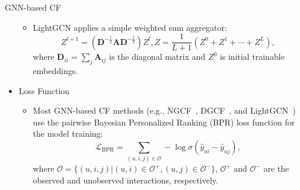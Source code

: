 \documentclass[t]{beamer}
\begin{document}
\begin{frame}[allowframebreaks]{GNN-based CF}
\begin{itemize}
    
    \begin{itemize}
        \item LightGCN applies a simple weighted sum aggregator:
\begin{equation*}
    \label{eq:lightgcn}
    Z^{l+1} =\left(\mathbf{D}^{-\frac{1}{2}} \mathbf{A} \mathbf{D}^{-\frac{1}{2}}\right) Z^{l}, 
    Z = \frac{1}{L+1}(Z^0 + Z^1 + \cdots + Z^L),
\end{equation*}
where $\mathbf{D}_{ii}=\sum_j \mathbf{A}_{ij}$ is the diagonal matrix and $Z^0$ is initial trainable embeddings.
    \end{itemize}
\framebreak
    \item Loss Function
    \begin{itemize}
        \item Most GNN-based CF methods (e.g., NGCF~, DGCF~, and LightGCN~) use the pairwise Bayesian Personalized Ranking (BPR) loss function for the model training:
\begin{equation*}
\mathcal{L}_{\text{BPR}}=\sum_{(u, i, j) \in \mathcal{O}}-\log \sigma\left(\hat{y}_{u i}-\hat{y}_{u j}\right),
\end{equation*}
where $\mathcal{O} = \{(u, i, j) | (u, i)\in \mathcal{O}^+, (u, j)\in \mathcal{O}^-\}$, $\mathcal{O}^+$ and $\mathcal{O}^-$ are the observed and unobserved interactions, respectively.
    \end{itemize}
\end{itemize}
\end{frame}
\end{document}
